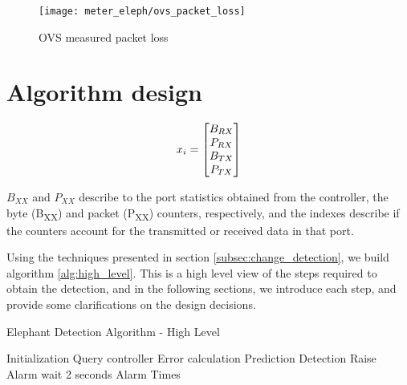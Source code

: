 \begin{figure} 
    \centering
    \texttt{[image: meter\_eleph/ovs\_packet\_loss]}
    \caption {OVS measured packet loss}
    \label{fig:ovs_packet_loss}
\end{figure} 

\section {Algorithm design}

\begin {equation*}
\centering
x_i = 
\begin{bmatrix}
B_{RX}\\
P_{RX}\\
B_{TX}\\
P_{TX}\\
\end{bmatrix}
\end {equation*}

\par $B_{XX}$ and $P_{XX}$ describe to the port statistics obtained from the controller, the byte (B\textsubscript{XX}) and packet (P\textsubscript{XX}) counters, respectively, and the indexes describe if the counters
account for the transmitted or received data in that port.

\par Using the techniques presented in section \ref{subsec:change_detection}, we build algorithm \ref{alg:high_level}. This is a high level view of the steps required to obtain the detection, and in the following sections,
we introduce each step, and provide some clarifications on the design decisions.

\begin{algorithm}[H]
    \caption{Elephant Detection Algorithm - High Level} \label{alg:high_level}
    \begin{algorithmic}[1]
            \State Initialization
            \State Query controller
            \Loop
                \State Error calculation
                \State Prediction
                \State Detection
                    \State Raise Alarm
                \EndIf
                \State wait 2 seconds
            \EndLoop
            \State \Return Alarm Times
        \EndProcedure 
       \end{algorithmic}
\end{algorithm}

